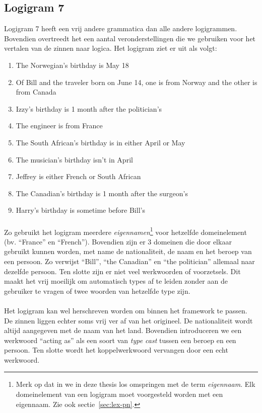 \subsection{Logigram 7}
Logigram 7 heeft een vrij andere grammatica dan alle andere logigrammen. Bovendien overtreedt het een aantal veronderstellingen die we gebruiken voor het vertalen van de zinnen naar logica. Het logigram ziet er uit als volgt:
\begin{enumerate}
  \item The Norwegian's birthday is May 18
  \item Of Bill and the traveler born on June 14, one is from Norway and the other is from Canada
  \item Izzy's birthday is 1 month after the politician's
  \item The engineer is from France
  \item The South African's birthday is in either April or May
  \item The musician's birthday isn't in April
  \item Jeffrey is either French or South African
  \item The Canadian's birthday is 1 month after the surgeon's
  \item Harry's birthday is sometime before Bill's
\end{enumerate}

\paragraph{} Zo gebruikt het logigram meerdere \textit{eigennamen}\footnote{Merk op dat in we in deze thesis los omspringen met de term \textit{eigennaam}. Elk domeinelement van een logigram moet voorgesteld worden met een eigennaam. Zie ook sectie~\ref{sec:lex-pn}.} voor hetzelfde domeinelement (bv. ``France'' en ``French''). Bovendien zijn er 3 domeinen die door elkaar gebruikt kunnen worden, met name de nationaliteit, de naam en het beroep van een persoon. Zo verwijst ``Bill'', ``the Canadian'' en ``the politician'' allemaal naar dezelfde persoon. Ten slotte zijn er niet veel werkwoorden of voorzetsels. Dit maakt het vrij moeilijk om automatisch types af te leiden zonder aan de gebruiker te vragen of twee woorden van hetzelfde type zijn.

\paragraph{} Het logigram kan wel herschreven worden om binnen het framework te passen. De zinnen liggen echter soms vrij ver af van het origineel. De nationaliteit wordt altijd aangegeven met de naam van het land. Bovendien introduceren we een werkwoord ``acting as'' als een soort van \textit{type cast} tussen een beroep en een persoon. Ten slotte wordt het koppelwerkwoord vervangen door een echt werkwoord.


